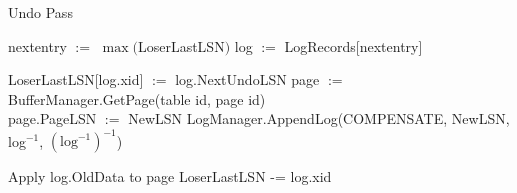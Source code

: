 \documentclass[main.tex]{subfiles}
\begin{document}
\begin{algorithm}
	\caption{Undo Pass}
	
	\begin{algorithmic}
				\State nextentry $:=$ $\max($LoserLastLSN$)$
				\State log $:=$ LogRecords[nextentry]
				
					\State LoserLastLSN[log.xid] $:=$ log.NextUndoLSN
					\State page $:=$ BufferManager.GetPage(table id, page id)\\
					
					\State page.PageLSN $:=$ NewLSN
					\State LogManager.AppendLog(COMPENSATE, NewLSN, log$^{-1}$, $\left( \mathrm{log}^{-1} \right)^{-1}$)
					
					\State Apply log.OldData to page
					\State LoserLastLSN -= log.xid
				\EndIf
			\EndWhile
		\EndFunction
	\end{algorithmic}
\end{algorithm}
\end{document}
